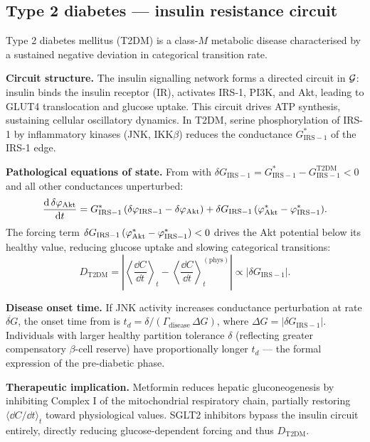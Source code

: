 \subsection{Type 2 diabetes — insulin resistance circuit}
\label{sec:ch07-eg-t2dm}

\begin{example}
\label{ex:ch07-t2dm}
Type 2 diabetes mellitus (T2DM) is a class-$M$ metabolic disease
characterised by a sustained negative deviation in categorical transition rate.

\textbf{Circuit structure.}  The insulin signalling network forms a directed
circuit in $\mathcal{G}$: insulin binds the insulin receptor (IR), activates IRS-1,
PI3K, and Akt, leading to GLUT4 translocation and glucose uptake.  This
circuit drives ATP synthesis, sustaining cellular oscillatory dynamics.
In T2DM, serine phosphorylation of IRS-1 by inflammatory kinases (JNK,
IKK$\beta$) reduces the conductance $G_{\mathrm{IRS-1}}^{*}$ of the
IRS-1 edge.

\textbf{Pathological equations of state.}  From 
with $\delta G_{\mathrm{IRS-1}} = G_{\mathrm{IRS-1}}^{*} - G_{\mathrm{IRS-1}}^{\mathrm{T2DM}} < 0$
and all other conductances unperturbed:
\begin{equation}
  \frac{\dd\,\delta\varphi_{\mathrm{Akt}}}{\dd t}
  = G_{\mathrm{IRS-1}}^{*}\,(\delta\varphi_{\mathrm{IRS-1}} - \delta\varphi_{\mathrm{Akt}})
    + \delta G_{\mathrm{IRS-1}}\,(\varphi_{\mathrm{Akt}}^{*} - \varphi_{\mathrm{IRS-1}}^{*}).
  \label{eq:ch07-T2DM-eqs}
\end{equation}
The forcing term $\delta G_{\mathrm{IRS-1}}\,(\varphi_{\mathrm{Akt}}^{*} - \varphi_{\mathrm{IRS-1}}^{*}) < 0$
drives the Akt potential below its healthy value, reducing glucose uptake and
slowing categorical transitions:
\begin{equation}
  D_{\mathrm{T2DM}}
  = \left|\left\langle\frac{\dd C}{\dd t}\right\rangle_t
    - \left\langle\frac{\dd C}{\dd t}\right\rangle_t^{(\mathrm{phys})}\right|
  \propto |\delta G_{\mathrm{IRS-1}}|.
  \label{eq:ch07-T2DM-score}
\end{equation}

\textbf{Disease onset time.}  If JNK activity increases conductance
perturbation at rate $\dot{\delta G}$, the onset time from
 is
$t_d = \delta/(\Gamma_{\mathrm{disease}}\,\Delta G)$, where $\Delta G =
|\delta G_{\mathrm{IRS-1}}|$.  Individuals with larger healthy partition
tolerance $\delta$ (reflecting greater compensatory $\beta$-cell reserve)
have proportionally longer $t_d$ — the formal expression of the pre-diabetic
phase.

\textbf{Therapeutic implication.}  Metformin reduces hepatic gluconeogenesis
by inhibiting Complex I of the mitochondrial respiratory chain, partially
restoring $\langle\dd C/\dd t\rangle_t$ toward physiological values.
SGLT2 inhibitors bypass the insulin circuit entirely, directly reducing
glucose-dependent forcing and thus $D_{\mathrm{T2DM}}$.
\end{example}

